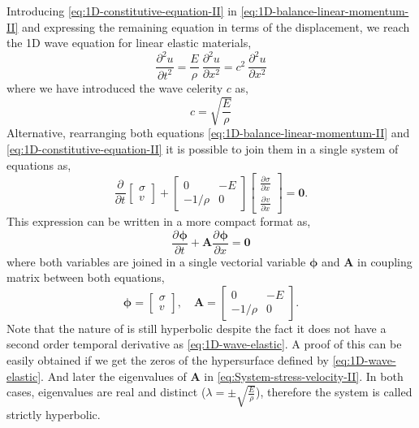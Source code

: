 \documentclass[preprint,12pt,a4paper]{elsarticle}
\newcommand{\Matrix}[1]{
  \ensuremath{\mathbf{{#1}}}
}
\newcommand{\Vector}[1]{
  \ensuremath{\mathbf{{#1}}}
}
\newcommand{\Deriv}[3][]{
  \ensuremath{\frac{\partial^{#1}{#2}}{ \partial {#3}^{#1} }}
}
\begin{document}
Introducing \eqref{eq:1D-constitutive-equation-II} in
\eqref{eq:1D-balance-linear-momentum-II} and expressing the remaining
equation in terms of the displacement, we reach the 1D wave
equation for linear elastic materials,
\begin{equation}
  \label{eq:1D-wave-elastic}
  \Deriv[2]{u}{t} = \frac{E}{\rho}\ \Deriv[2]{u}{x} = c^2\ \Deriv[2]{u}{x}
\end{equation}
where we have introduced the wave celerity $c$ as,
\begin{equation}
  \label{eq:1D-elastic-wave-celerity}
  c = \sqrt{\frac{E}{\rho}}
\end{equation}
Alternative, rearranging both equations
\eqref{eq:1D-balance-linear-momentum-II} and
\eqref{eq:1D-constitutive-equation-II} it is possible to join them in a
single system of equations as,
\begin{equation}
  \label{eq:System-stress-velocity}
  \Deriv{}{t} \left[
    \begin{array}{c}
      \sigma \\
      v
    \end{array}
  \right] + \left[
    \begin{array}{cc}
      0 & - E \\
      - 1/\rho & 0 
    \end{array} \right] \left[
    \begin{array}{c}
      \Deriv{\sigma}{x} \\
      \Deriv{v}{x}
    \end{array}
  \right] = \Vector{0}.
\end{equation}
This expression can be written in a more compact format as,
\begin{equation}
  \label{eq:System-stress-velocity-II}
  \Deriv{\Vector{\phi}}{t} + \Matrix{A}\Deriv{\Vector{\phi}}{x} = \Vector{0}
\end{equation}
where both variables are joined in a single vectorial variable
$\Vector{\phi}$ and $\Matrix{A}$ in coupling matrix between both equations,
\begin{equation*}
  \Vector{\phi} = \left[
    \begin{array}{c}
      \sigma \\
      v
    \end{array}
  \right],\quad 
  \Matrix{A} =  \left[
    \begin{array}{cc}
      0 & - E\\
      - 1/\rho & 0 
    \end{array} \right].
\end{equation*}
Note that the nature of \label{eq:eq:System-stress-velocity-II} is still
hyperbolic despite the fact it does not have a second order
temporal derivative as \eqref{eq:1D-wave-elastic}. A proof of this can
be easily obtained if we get the zeros of the hypersurface defined by
\eqref{eq:1D-wave-elastic}. And later the eigenvalues of $\Matrix{A}$
in \eqref{eq:System-stress-velocity-II}. In both cases, eigenvalues
are real and distinct ($\lambda = \pm \sqrt{\frac{E}{\rho}}$),
therefore the system is called strictly hyperbolic.
\end{document}
